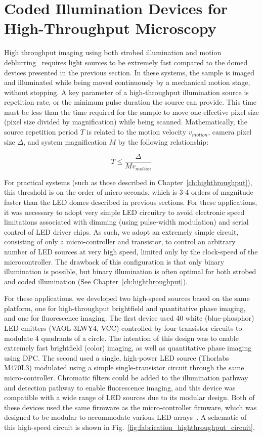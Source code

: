 \section{Coded Illumination Devices for High-Throughput Microscopy}\label{sec:fabrication:highthroughput}

High throughput imaging using both strobed illumination and motion deblurring~\cite{raskar2006coded} requires light sources to be extremely fast compared to the domed devices presented in the previous section. In these systems, the sample is imaged and illuminated while being moved continuously by a mechanical motion stage, without stopping. A key parameter of a high-throughput illumination source is repetition rate, or the minimum pulse duration the source can provide. This time must be less than the time required for the sample to move one effective pixel size (pixel size divided by magnification) while being scanned. Mathematically, the source repetition period $T$ is related to the motion velocity $v_{motion}$, camera pixel size $\Delta$, and system magnification $M$ by the following relationship:

\begin{equation}
    T \leq \frac{\Delta}{Mv_{motion}}
\end{equation}

For practical systems (such as those described in Chapter~\ref{ch:highthroughput}), this threshold is on the order of micro-seconds, which is 3-4 orders of magnitude faster than the LED domes described in previous sections. For these applications, it was necessary to adopt very simple LED circuitry to avoid electronic speed limitations associated with dimming (using pulse-width modulation) and serial control of LED driver chips. As such, we adopt an extremely simple circuit, consisting of only a micro-controller and transistor, to control an arbitrary number of LED sources at very high speed, limited only by the clock-speed of the microcontroller. The drawback of this configuration is that only binary illumination is possible, but binary illumination is often optimal for both strobed and coded illumination (See Chapter~\ref{ch:highthroughput}).

For these applications, we developed two high-speed sources based on the same platform, one for high-throughput brightfield and quantitative phase imaging, and one for fluorescence imaging. The first device used 40 white (blue-phosphor) LED emitters (VAOL-3LWY4, VCC) controlled by four transistor circuits to modulate 4 quadrants of a circle. The intention of this design was to enable extremely fast brightfield (color) imaging, as well as quantitative phase imaging using DPC. The second used a single, high-power LED source (Thorlabs M470L3) modulated using a simple single-transistor circuit through the same micro-controller. Chromatic filters could be added to the illumination pathway and detection pathway to enable fluorescence imaging, and this device was compatible with a wide range of LED sources due to its modular design. Both of these devices used the same firmware as the micro-controller firmware, which was designed to be modular to accommodate various LED arrays~\cite{illuminate}. A schematic of this high-speed circuit is shown in Fig.~\ref{fig:fabrication_highthroughput_circuit}.


